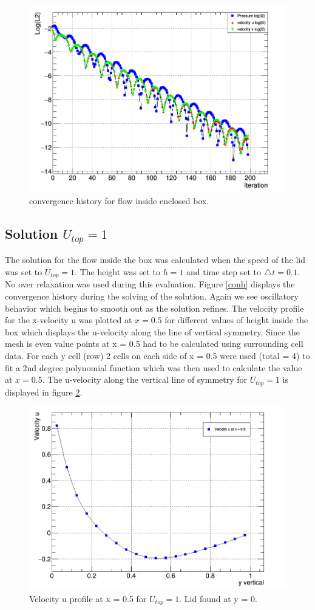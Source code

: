 \documentclass[paper=a4, fontsize=11pt, abstract=on]{scrartcl}
\numberwithin{equation}{section}		%
\numberwithin{figure}{section}			%
\numberwithin{table}{section}				%
\begin{document}
\begin{figure}[H]
\centering
\includegraphics[width=0.80\linewidth]{stabord}
\caption{convergence history for flow inside enclosed box. }
\label{con}
\end{figure}

 

\subsection{Solution $U_{top} = 1$}
The solution for the flow inside the box was calculated when the speed of the lid was set to $U_{top} = 1$. The height was set to $h=1$ and time step set to $\triangle t = 0.1$. No over relaxation was used during this evaluation. Figure \ref{conh} displays the convergence history during the solving of the solution. Again we see oscillatory behavior which begins to smooth out as the solution refines. The velocity profile for the x-velocity u was plotted at $x=0.5$ for different values of height inside the box which displays the u-velocity along the line of vertical symmetry. Since the mesh is even value points at x = 0.5 had to be calculated using surrounding cell data.  For each y cell (row) 2 cells on each side of x = 0.5 were used (total = 4) to fit a 2nd degree polynomial function which was then used to calculate the value at $x= 0.5$. The u-velocity along the vertical line of symmetry for $U_{top} = 1$ is displayed in figure \ref{usym1}. 

\begin{figure}[H]
\centering
\includegraphics[width=0.80\linewidth]{con1}
\caption{Velocity u profile at x = 0.5 for $U_{top}=1$. Lid found at y = 0. }
\label{usym1}
\end{figure}
\end{document}
